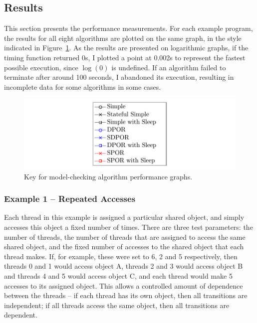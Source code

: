 \documentclass[12pt,a4paper,twoside,openright]{report}
\begin{document}
\subsection{Results}
This section presents the performance measurements.
For each example program, the results for all eight
algorithms are plotted on the same graph, in the
style indicated in Figure~\ref{fig:key}.
As the results are
presented on logarithmic graphs, if the timing function
returned 0s, I plotted a point at 0.002s
to represent the fastest possible execution, since
$\log(0)$ is undefined.
If an algorithm failed to terminate after around
100 seconds, I abandoned its execution,
resulting in incomplete data
for some algorithms in some cases.

\begin{figure}
	\includegraphics[width=\textwidth]{key}
	\caption{Key for model-checking algorithm performance graphs.}
	\label{fig:key}
\end{figure}

\subsubsection{Example 1 -- Repeated Accesses}
Each thread in this example is assigned a particular
shared object, and simply accesses this object a
fixed number of times. There are three test parameters:
the number of threads, the number of threads that are
assigned to access the same shared object, and the fixed
number of accesses to the shared object that each thread
makes. If, for example, these were set to 6, 2 and 5
respectively, then threads 0 and 1 would access object A,
threads 2 and 3 would access object B and threads 4 and 5
would access object C, and each thread would make 5 accesses
to its assigned object. This allows a controlled amount of
dependence between the threads -- if each thread has its own
object, then all transitions are independent; if all threads
access the same object, then all transitions are dependent.
\end{document}
